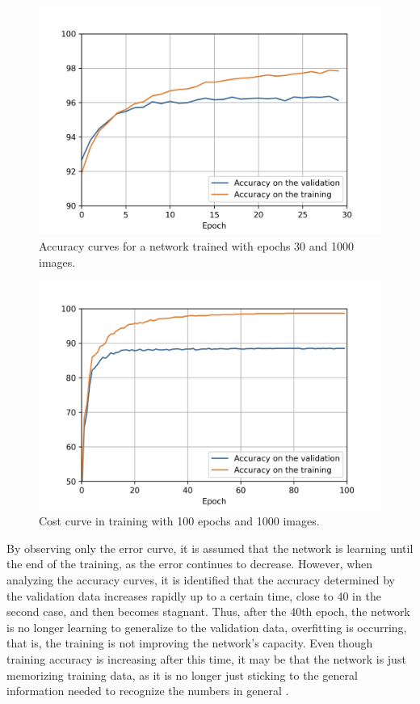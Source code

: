 \begin{figure}
    \centering
    \includegraphics[scale=0.6]{images/figure115.jpg}
    \caption{Accuracy curves for a network trained with epochs 30 and 1000 images.}
    \label{fig:figure115}
\end{figure}

\begin{figure}
    \centering
    \includegraphics[scale=0.6]{images/figure116.jpg}
    \caption{Cost curve in training with 100 epochs and 1000 images.}
    \label{fig:figure116}
\end{figure}

By observing only the error curve, it is assumed that the network is learning until the end of the training, as the error continues to decrease. However, when analyzing the accuracy curves, it is identified that the accuracy determined by the validation data increases rapidly up to a certain time, close to 40 in the second case, and then becomes stagnant. Thus, after the 40th epoch, the network is no longer learning to generalize to the validation data, overfitting is occurring, that is, the training is not improving the network's capacity. Even though training accuracy is increasing after this time, it may be that the network is just memorizing training data, as it is no longer just sticking to the general information needed to recognize the numbers in general \cite{nielsen2015}.

